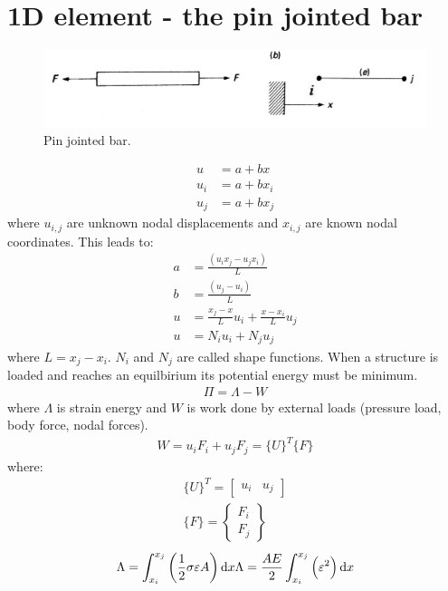 \section{1D element - the pin jointed bar}
\begin{figure}[H]
	\centering
	\includegraphics[width = \textwidth]{./img/figure3.png}
	\caption{Pin jointed bar.}
\end{figure}
\begin{align}
	u &= a + bx\\
	u_i &= a + bx_i\\
	u_j &= a + bx_j
\end{align}
where $u_{i,j}$ are unknown nodal displacements and $x_{i,j}$ are known nodal coordinates. This leads to:
\begin{align}
	a &= \frac{\left(u_ix_j-u_jx_i\right)}{L}\\
	b &= \frac{\left(u_j-u_i\right)}{L}\\
	u&= \frac{x_j-x}{L}u_i + \frac{x-x_i}{L}u_j\\
	u &= N_iu_i + N_ju_j
\end{align}
where $L = x_j - x_i$. $N_i$ and $N_j$ are called shape functions. When a structure is loaded and reaches an equilbirium its potential energy must be minimum.
\begin{gather}
	\Pi = \Lambda - W
\end{gather}
where $\Lambda$ is strain energy and $W$ is work done by external loads (pressure load, body force, nodal forces).
\begin{gather}
	W = u_i F_i + u_j F_j = \{U\}^T \{F\}
\end{gather}
where:
\begin{gather}
	\{U\}^T = \begin{bmatrix}
		u_i & u_j
	\end{bmatrix}\\
	\{F\} = \begin{Bmatrix}
		F_i\\
		F_j
	\end{Bmatrix}
\end{gather}
\begin{gather}
	\Lambda = \int_{x_i}^{x_j}\left(\frac{1}{2}\sigma\varepsilon A\right) \dif x
	\Lambda = \frac{AE}{2}\int_{x_i}^{x_j}\left(\varepsilon^2\right)\dif x
\end{gather}
